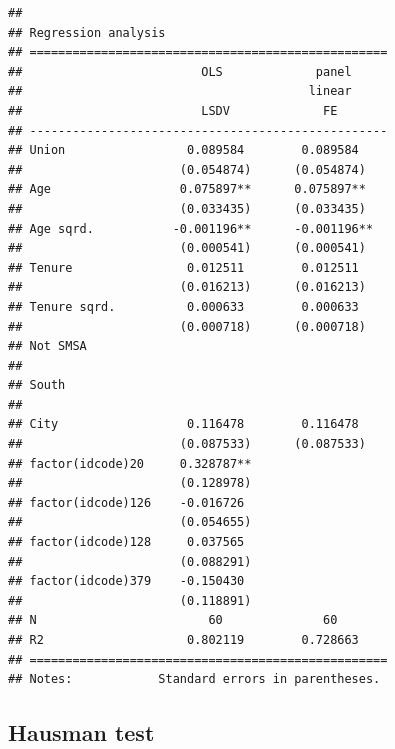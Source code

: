 \documentclass[
]{article}
\begin{document}
\begin{verbatim}
## 
## Regression analysis
## ==================================================
##                         OLS             panel     
##                                        linear     
##                         LSDV             FE       
## --------------------------------------------------
## Union                 0.089584        0.089584    
##                      (0.054874)      (0.054874)   
## Age                  0.075897**      0.075897**   
##                      (0.033435)      (0.033435)   
## Age sqrd.           -0.001196**      -0.001196**  
##                      (0.000541)      (0.000541)   
## Tenure                0.012511        0.012511    
##                      (0.016213)      (0.016213)   
## Tenure sqrd.          0.000633        0.000633    
##                      (0.000718)      (0.000718)   
## Not SMSA                                          
##                                                   
## South                                             
##                                                   
## City                  0.116478        0.116478    
##                      (0.087533)      (0.087533)   
## factor(idcode)20     0.328787**                   
##                      (0.128978)                   
## factor(idcode)126    -0.016726                    
##                      (0.054655)                   
## factor(idcode)128     0.037565                    
##                      (0.088291)                   
## factor(idcode)379    -0.150430                    
##                      (0.118891)                   
## N                        60              60       
## R2                    0.802119        0.728663    
## ==================================================
## Notes:            Standard errors in parentheses.
\end{verbatim}

\hypertarget{hausman-test}{%
\subsection{Hausman test}\label{hausman-test}}
\end{document}
